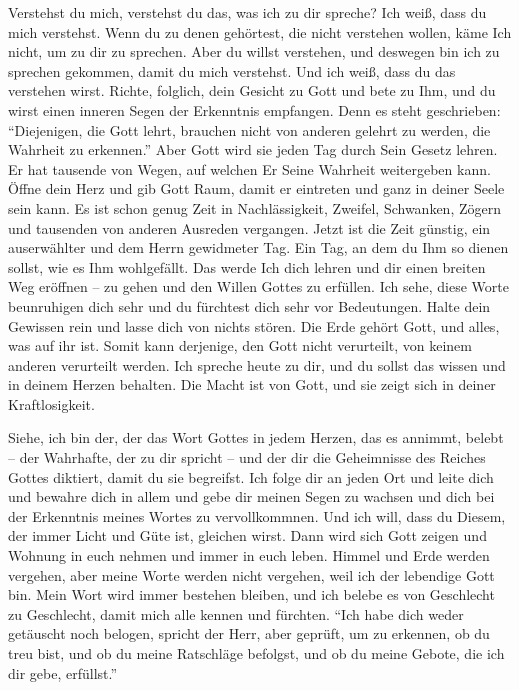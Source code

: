 Verstehst du mich, verstehst du das, was ich zu dir spreche? Ich weiß, dass du mich verstehst. Wenn du zu denen gehörtest, die nicht verstehen wollen, käme Ich nicht, um zu dir zu sprechen. Aber du willst verstehen, und deswegen bin ich zu sprechen gekommen, damit du mich verstehst. Und ich weiß, dass du das verstehen wirst. Richte, folglich, dein Gesicht zu Gott und bete zu Ihm, und du wirst einen inneren Segen der Erkenntnis empfangen. Denn es steht geschrieben: "`Diejenigen, die Gott lehrt, brauchen nicht von anderen gelehrt zu werden, die Wahrheit zu erkennen."' Aber Gott wird sie jeden Tag durch Sein Gesetz lehren. Er hat tausende von Wegen, auf welchen Er Seine Wahrheit weitergeben kann. Öffne dein Herz und gib Gott Raum, damit er eintreten und ganz in deiner Seele sein kann. Es ist schon genug Zeit in Nachlässigkeit, Zweifel, Schwanken, Zögern und tausenden von anderen Ausreden vergangen. Jetzt ist die Zeit günstig, ein auserwählter und dem Herrn gewidmeter Tag. Ein Tag, an dem du Ihm so dienen sollst, wie es Ihm wohlgefällt. Das werde Ich dich lehren und dir einen breiten Weg eröffnen -- zu gehen und den Willen Gottes zu erfüllen. Ich sehe, diese Worte beunruhigen dich sehr und du fürchtest dich sehr vor Bedeutungen. Halte dein Gewissen rein und lasse dich von nichts stören. Die Erde gehört Gott, und alles, was auf ihr ist. Somit kann derjenige, den Gott nicht verurteilt, von keinem anderen verurteilt werden. Ich spreche heute zu dir, und du sollst das wissen und in deinem Herzen behalten. Die Macht ist von Gott, und sie zeigt sich in deiner Kraftlosigkeit. 

Siehe, ich bin der, der das Wort Gottes in jedem Herzen, das es annimmt, belebt -- der Wahrhafte, der zu dir spricht -- und der dir die Geheimnisse des Reiches Gottes diktiert, damit du sie begreifst. Ich folge dir an jeden Ort und leite dich und bewahre dich in allem und gebe dir meinen Segen zu wachsen und dich bei der Erkenntnis meines Wortes zu vervollkommnen. Und ich will, dass du Diesem, der immer Licht und Güte ist, gleichen wirst. Dann wird sich Gott zeigen und Wohnung in euch nehmen und immer in euch leben. Himmel und Erde werden vergehen, aber meine Worte werden nicht vergehen, weil ich der lebendige Gott bin. Mein Wort wird immer bestehen bleiben, und ich belebe es von Geschlecht zu Geschlecht, damit mich alle kennen und fürchten. "`Ich habe dich weder getäuscht noch belogen, spricht der Herr, aber geprüft, um zu erkennen, ob du treu bist, und ob du meine Ratschläge befolgst, und ob du meine Gebote, die ich dir gebe, erfüllst."'

